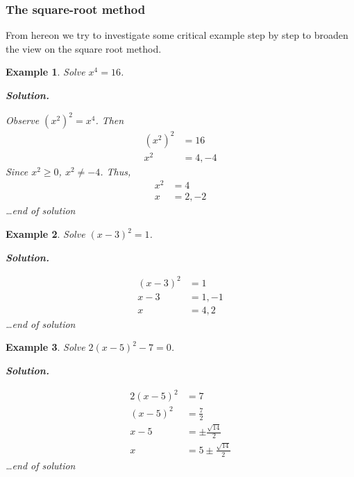 \documentclass[12pt]{article}
\newtheorem*{example}{Example}
\newenvironment{solution}{\textbf{Solution.} \par}{\hfill \textit{\dots end of solution}}
\begin{document}
    \subsubsection*{The square-root method}

    From hereon we try to investigate some critical example step by step to broaden the view on the square root method.

    \begin{example}
        Solve $x^4=16$.

        \begin{solution}
            Observe $(x^2)^2=x^4$. Then \begin{align*}
                (x^2)^2&=16\\
                x^2&=4,-4
            \end{align*}
            Since $x^2\geq 0$, $x^2\neq -4$. Thus,\begin{align*}
                x^2&=4\\
                x&=2,-2
            \end{align*}
        \end{solution}
    \end{example}

    \begin{example}
        Solve $(x-3)^2=1$.

        \begin{solution}
            \begin{align*}
                (x-3)^2&=1\\
                x-3&=1, -1\\
                x&=4, 2
            \end{align*}
        \end{solution}
    \end{example}

    \begin{example}
        Solve $2(x-5)^2-7=0$.

        \begin{solution}
            \begin{align*}
                2(x-5)^2&=7\\
                (x-5)^2&=\frac{7}{2}\\
                x-5&=\pm\frac{\sqrt{14}}{2}\\
                x&=5\pm\frac{\sqrt{14}}{2}
            \end{align*}
        \end{solution}
    \end{example}
\end{document}
